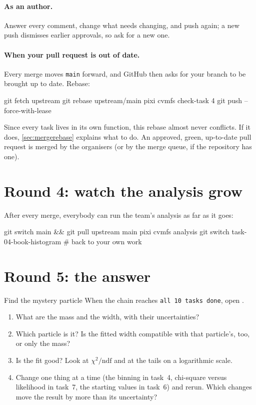 \paragraph{As an author.} Answer every comment, change what needs changing,
and push again; a new push dismisses earlier approvals, so ask for a new one.

\paragraph{When your pull request is out of date.} Every merge moves
\texttt{main} forward, and GitHub then asks for your branch to be brought up
to date. Rebase:
\begin{shell}
git fetch upstream
git rebase upstream/main
pixi cvmfs check-task 4
git push --force-with-lease
\end{shell}
Since every task lives in its own function, this rebase almost never
conflicts. If it does, \cref{sec:mergerebase} explains what to do. An
approved, green, up-to-date pull request is merged by the organisers (or by
the merge queue, if the repository has one).

\section{Round 4: watch the analysis grow}

After every merge, everybody can run the team's analysis as far as it goes:
\begin{shell}
git switch main && git pull upstream main
pixi cvmfs analysis
git switch task-04-book-histogram           # back to your own work
\end{shell}

\section{Round 5: the answer}

\begin{exercise}{Find the mystery particle}
When the chain reaches \texttt{all 10 tasks done}, open
.
\begin{enumerate}
  \item What are the mass and the width, with their uncertainties?
  \item Which particle is it? Is the fitted width compatible with that
        particle's, too, or only the mass?
  \item Is the fit good? Look at $\chi^2/\mathrm{ndf}$ and at the tails on a
        logarithmic scale.
  \item Change one thing at a time (the binning in task~4, chi-square versus
        likelihood in task~7, the starting values in task~6) and rerun. Which
        changes move the result by more than its uncertainty?
\end{enumerate}
\end{exercise}


